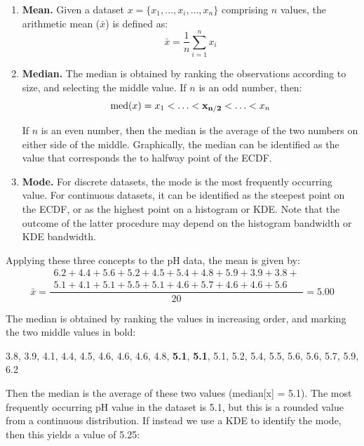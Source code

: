 \begin{enumerate}
\item{\bf Mean.} Given a dataset $x = \{x_1,\ldots ,x_i,\ldots, x_n\}$
  comprising $n$ values, the arithmetic mean ($\bar{x}$) is defined
  as:
  \begin{equation}
    \bar{x} = \frac{1}{n}\sum\limits_{i=1}^{n}x_i
    \label{eq:mean}
  \end{equation}
\item{\bf Median.} The median is obtained by ranking the observations
  according to size, and selecting the middle value. If $n$ is an odd
  number, then:
  \begin{equation}
    \mbox{med}(x) = x_1 < \ldots < {\bf x_{n/2}} < \ldots < x_n
  \end{equation}

  If $n$ is an even number, then the median is the average of the two
  numbers on either side of the middle. Graphically, the median can be
  identified as the value that corresponds the to halfway point of the
  ECDF.
  
\item{\bf Mode.} For discrete datasets, the mode is the most
  frequently occurring value. For continuous datasets, it can be
  identified as the steepest point on the ECDF, or as the highest
  point on a histogram or KDE. Note that the outcome of the latter
  procedure may depend on the histogram bandwidth or KDE bandwidth.
\end{enumerate}

Applying these three concepts to the pH data, the mean is given by:
\begin{equation*}
  \bar{x} = \frac{
    \begin{array}{c}
      6.2+4.4+5.6+5.2+4.5+5.4+4.8+5.9+3.9+3.8+ \\
      5.1+4.1+5.1+5.5+5.1+4.6+5.7+4.6+4.6+5.6
    \end{array}
  }{20} = 5.00
\end{equation*}

The median is obtained by ranking the values in increasing order, and
marking the two middle values in bold:

\begin{center}
  {3.8, 3.9, 4.1, 4.4, 4.5, 4.6, 4.6, 4.6, 4.8, \textbf{5.1},
  \textbf{5.1}, 5.1, 5.2, 5.4, 5.5, 5.6, 5.6, 5.7, 5.9, 6.2}
\end{center}

Then the median is the average of these two values (median[x] =
5.1). The most frequently occurring pH value in the dataset is 5.1,
but this is a rounded value from a continuous distribution. If instead
we use a KDE to identify the mode, then this yields a value of 5.25:

